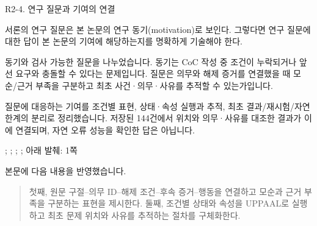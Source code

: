 \begin{reviewitem}{R2-4. 연구 질문과 기여의 연결}

\begin{reviewercomment}

서론의 연구 질문은 본 논문의 연구 동기(motivation)로 보인다. 그렇다면 연구 질문에 대한 답이 본 논문의 기여에 해당하는지를 명확하게 기술해야 한다.

\end{reviewercomment}

\begin{authorresponse}

동기와 검사 가능한 질문을 나누었습니다. 동기는 CoC 작성 중 조건이 누락되거나 앞선 요구와 충돌할 수 있다는 문제입니다. 질문은 의무와 해제 증거를 연결했을 때 모순/근거 부족을 구분하고 최초 사건·의무·사유를 추적할 수 있는가입니다.

질문에 대응하는 기여를 조건별 표현, 상태·속성 실행과 추적, 최초 결과/재시험/자연 한계의 분리로 정리했습니다. 저장된 144건에서 위치와 의무·사유를 대조한 결과가 이에 연결되며, 자연 오류 성능을 확인한 답은 아닙니다.

\end{authorresponse}

\begin{manuscriptrevision}{; ; ; ; 아래 발췌: 1쪽}

본문에 다음 내용을 반영했습니다.

\begin{quote}

첫째, 원문 구절--의무 ID--해제 조건--후속 증거--행동을 연결하고 모순과 근거 부족을 구분하는 표현을 제시한다. 둘째, 조건별 상태와 속성을 UPPAAL로 실행하고 최초 문제 위치와 사유를 추적하는 절차를 구체화한다.

\end{quote}

\end{manuscriptrevision}

\end{reviewitem}

\clearpage

